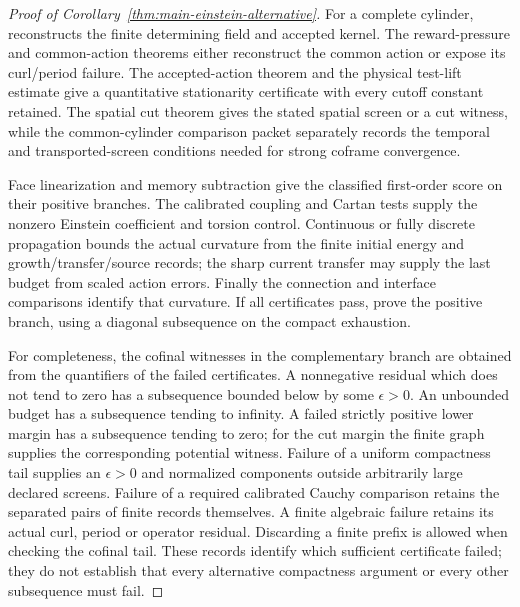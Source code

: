 \documentclass[11pt]{article}
\numberwithin{equation}{section}
\theoremstyle{definition}
\theoremstyle{remark}
\begin{document}
\begin{proof}[Proof of Corollary~\ref{thm:main-einstein-alternative}]
For a complete cylinder,  reconstructs the
finite determining field and accepted kernel.  The reward-pressure and
common-action theorems either reconstruct the common action or expose its
curl/period failure.  The accepted-action theorem and the physical test-lift
estimate give a quantitative stationarity certificate with every cutoff
constant retained.  The spatial cut theorem gives the stated spatial screen
or a cut witness, while the common-cylinder comparison packet separately
records the temporal and transported-screen conditions needed for strong
coframe convergence.

Face linearization and memory subtraction give the classified first-order
score on their positive branches.  The calibrated coupling and Cartan tests
supply the nonzero Einstein coefficient and torsion control.  Continuous or
fully discrete propagation bounds the actual curvature from the finite
initial energy and growth/transfer/source records; the sharp current transfer
may supply the last budget from scaled action errors.  Finally the connection
and interface comparisons identify that curvature.  If all certificates pass,
 prove the positive branch, using a diagonal subsequence on the compact exhaustion.

For completeness, the cofinal witnesses in the complementary branch are obtained
from the quantifiers of the failed certificates.  A nonnegative residual
which does not tend to zero has a subsequence bounded below by some
$\epsilon>0$.  An unbounded budget has a subsequence tending to infinity.
A failed strictly positive lower margin has a subsequence tending to zero;
for the cut margin the finite graph supplies the corresponding potential
witness.  Failure of a uniform compactness tail supplies an $\epsilon>0$
and normalized components outside arbitrarily large declared screens.
Failure of a required calibrated Cauchy comparison retains the separated
pairs of finite records themselves.  A finite algebraic failure retains its
actual curl, period or operator residual.  Discarding a finite prefix is
allowed when checking the cofinal tail.  These records identify which
sufficient certificate failed; they do not establish that every alternative
compactness argument or every other subsequence must fail.
\end{proof}
\end{document}
